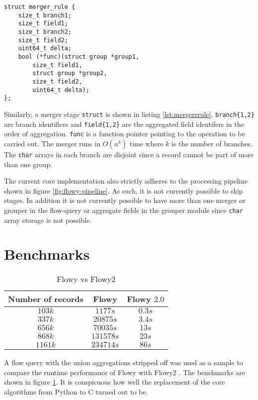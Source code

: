 \begin{lstlisting}
struct merger_rule {
	size_t branch1;
	size_t field1;
	size_t branch2;
	size_t field2;
	uint64_t delta;
	bool (*func)(struct group *group1,
		size_t field1,
		struct group *group2,
		size_t field2,
		uint64_t delta);
};
\end{lstlisting}

Similarly, a merger stage \texttt{struct} is shown in listing \ref{lst:mergerrrule}. \texttt{branch\{1,2\}} are branch identifiers and \texttt{field\{1,2\}} are the aggregated field identifers in the order of aggregation. \texttt{func} is a function pointer pointing to the operation to be carried out. The merger runs in $O(n^k)$ time where $k$ is the number of branches. The \texttt{char} arrays in each branch are disjoint since a record cannot be part of more than one group.

The current core implementation also strictly adheres to the processing pipeline shown in figure \ref{fig:flowy-pipeline}. As such, it is not currently possible to skip stages. In addition it is not currently possible to have more than one merger or grouper in the flow-query or aggregate fields in the grouper module since \texttt{char} array storage is not possible. 

\section{Benchmarks}\label{sec:benchmarks}
\begin{table}[h!]
	\begin{center}
		\begin{tabular}{|c|c|c|}
		\hline	
		Number of records & Flowy & Flowy $2.0$ \\
		\hline
		\hline 
		$103k$ & $1177s$ & $0.3s$\\
		\hline 
		$337k$ & $20875s$ & $3.4s$\\
		\hline
		$656k$ & $70035s$ & $13s$\\
		\hline
		$868k$ & $131578s$ & $23s$\\
		\hline
		$1161k$ & $234714s$ & $86s$\\
		\hline
		\end{tabular}
	\end{center}
\caption{Flowy vs Flowy2 \cite{jschauer:thesis:2011}}
\label{tab:flowy2-benchmarks}
\end{table}
A flow query with the union aggregations stripped off was used as a sample to compare the runtime performance of Flowy \cite{kkanev:thesis:2009} with Flowy2 \cite{jschauer:thesis:2011} . The benchmarks are shown in figure \ref{tab:flowy2-benchmarks}. It is conspicuous how well the replacement of the core algorithms from Python to C turned out to be. 

